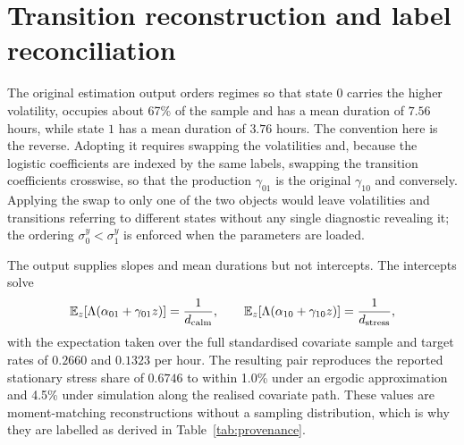 \section{Transition reconstruction and label reconciliation}
\label{app:transitions}

The original estimation output orders regimes so that state $0$ carries the
higher volatility, occupies about 67\% of the sample and has a mean duration of
$7.56$ hours, while state $1$ has a mean duration of $3.76$ hours. The
convention here is the reverse. Adopting it requires swapping the volatilities
and, because the logistic coefficients are indexed by the same labels,
swapping the transition coefficients crosswise, so that the production
$\gamma_{01}$ is the original $\gamma_{10}$ and conversely. Applying the swap
to only one of the two objects would leave volatilities and transitions
referring to different states without any single diagnostic revealing it; the
ordering $\sigma^y_0<\sigma^y_1$ is enforced when the parameters are loaded.

The output supplies slopes and mean durations but not intercepts. The
intercepts solve
\begin{equation}
  \mathbb{E}_z\!\left[\Lambda\!\left(\alpha_{01}+\gamma_{01}z\right)\right]
     = \frac{1}{d_{\mathrm{calm}}},\qquad
  \mathbb{E}_z\!\left[\Lambda\!\left(\alpha_{10}+\gamma_{10}z\right)\right]
     = \frac{1}{d_{\mathrm{stress}}},
\end{equation}
with the expectation taken over the full standardised covariate sample and
target rates of $0.2660$ and $0.1323$ per hour. The resulting pair reproduces
the reported stationary stress share of $0.6746$ to within 1.0\% under an
ergodic approximation and 4.5\% under simulation along the realised covariate
path. These values are moment-matching reconstructions without a sampling
distribution, which is why they are labelled as derived in
Table~\ref{tab:provenance}.
